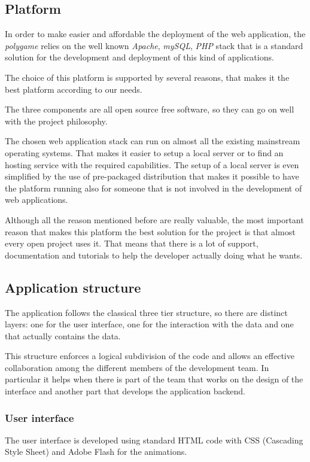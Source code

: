 \subsection{Platform}
In order to make easier and affordable the deployment of the web application, the \emph{polygame} relies on the well known \emph{Apache}, \emph{mySQL}, \emph{PHP} stack that is a standard solution for the development and deployment of this kind of applications.

The choice of this platform is supported by several reasons, that makes it the best platform according to our needs.

The three components are all open source free software, so they can go on well with the project philosophy.

The chosen web application stack can run on almost all the existing mainstream operating systems. That makes it easier to setup a local server or to find an hosting service with the required capabilities. The setup of a local server is even simplified by the use of pre-packaged distribution that makes it possible to have the platform running also for someone that is not involved in the development of web applications.

Although all the reason mentioned before are really valuable, the most important reason that makes this platform the best solution for the project is that almost every open project uses it. That means that there is a lot of support, documentation and tutorials to help the developer actually doing what he wants.

\subsection{Application structure}
The application follows the classical three tier structure, so there are distinct layers: one for the user interface, one for the interaction with the data and one that actually contains the data.

This structure enforces a logical subdivision of the code and allows an effective collaboration among the different members of the development team. In particular it helps when there is part of the team that works on the design of the interface and another part that develops the application backend.
\subsubsection{User interface}
The user interface is developed using standard HTML code with CSS (Cascading Style Sheet) and Adobe Flash for the animations.

